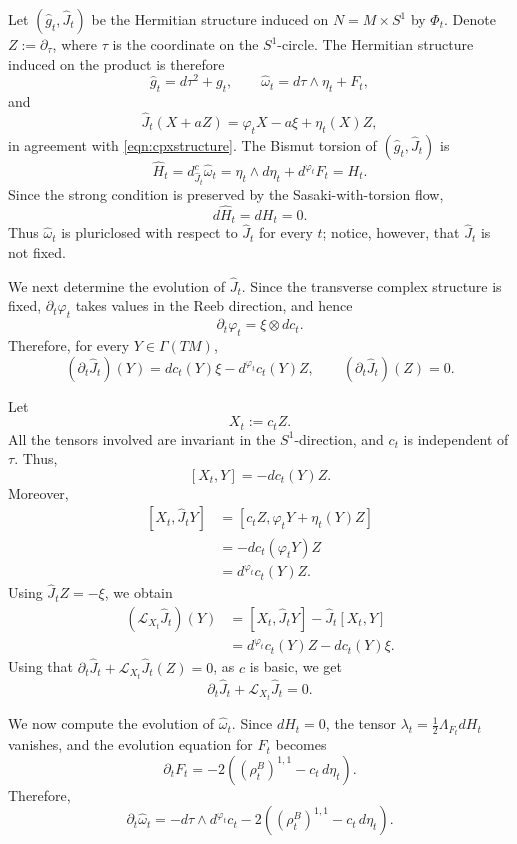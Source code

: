 \documentclass{article}
\makeatletter
\renewenvironment{proof}[1][\proofname]{%
  \par\pushQED{\qed}%
  \normalfont\topsep6\p@\@plus6\p@\relax
  \trivlist
  \item[\hskip\labelsep
        \textbf{\textup{#1}}\@addpunct{.}]\ignorespaces
}{%
  \popQED\endtrivlist\@endpefalse
}
\theoremstyle{definition}
\numberwithin{equation}{section}
\makeatother
\begin{document}
\begin{proof}
Let $(\widehat g_t,\widehat J_t)$ be the Hermitian structure induced on $N=M \times S^1$ by $\Phi_t$. Denote $Z:=\partial_\tau$, where $\tau$ is the coordinate on the $S^1$-circle. The Hermitian structure induced on the product is therefore 
\[
\widehat g_t=d\tau^2+g_t,
\qquad
\widehat\omega_t=d\tau\wedge\eta_t+F_t,
\]
and
\[
\widehat J_t(X+aZ)
=
\varphi_tX-a\xi+\eta_t(X)Z,
\]
in agreement with \eqref{eqn:cpxstructure}.
The Bismut torsion of $(\widehat g_t,\widehat J_t)$ is \[ \widehat H_t = d^c_{\widehat J_t}\widehat\omega_t = \eta_t\wedge d\eta_t+d^{\varphi_t}F_t = H_t. \] 
Since the strong condition is preserved by the Sasaki-with-torsion flow, \[ d\widehat H_t=dH_t=0. \] Thus $\widehat\omega_t$ is pluriclosed with respect to $\widehat J_t$ for every $t$; notice, however, that
$\widehat J_t$ is not fixed.

We next determine the evolution of $\widehat J_t$. Since the
transverse complex structure is fixed, $\partial_t\varphi_t$ takes
values in the Reeb direction, and hence
\[
\partial_t\varphi_t=\xi\otimes dc_t.
\]
Therefore, for every $Y\in \Gamma(TM)$,
\[
(\partial_t\widehat J_t)(Y)
=
dc_t(Y)\xi-d^{\varphi_t}c_t(Y)Z,
\qquad
(\partial_t\widehat J_t)(Z)=0.
\]

Let
\[
X_t:=c_tZ.
\]
All the tensors involved are invariant in the $S^1$-direction, and
$c_t$ is independent of $\tau$. Thus,
\[
[X_t,Y]=-dc_t(Y)Z.
\]
Moreover,
\[
\begin{aligned}
[X_t,\widehat J_tY]
&=
[c_tZ,\varphi_tY+\eta_t(Y)Z]\\
&=
-dc_t(\varphi_tY)Z\\
&=
d^{\varphi_t}c_t(Y)Z.
\end{aligned}
\]
Using $\widehat J_tZ=-\xi$, we obtain
\[
\begin{aligned}
(\mathcal L_{X_t}\widehat J_t)(Y)
&=
[X_t,\widehat J_tY]
-
\widehat J_t[X_t,Y]\\
&=
d^{\varphi_t}c_t(Y)Z-dc_t(Y)\xi.
\end{aligned}
\]
Using that $\partial_t\widehat J_t
+
\mathcal L_{X_t}\widehat J_t (Z)=0$, as $c$ is basic, we get
\[
\partial_t\widehat J_t
+
\mathcal L_{X_t}\widehat J_t
=
0.
\]

We now compute the evolution of $\widehat\omega_t$. Since $dH_t=0$,
the tensor $\lambda_t=\frac12\Lambda_{F_t}dH_t$ vanishes, and the
evolution equation for $F_t$ becomes
\[
\partial_tF_t
=
-2\left((\rho_t^B)^{1,1}-c_t\,d\eta_t\right).
\]
Therefore,
\begin{equation}
\label{eqn:product-omega-evolution}
\partial_t\widehat\omega_t
=
-d\tau\wedge d^{\varphi_t}c_t
-
2\left((\rho_t^B)^{1,1}-c_t\,d\eta_t\right).
\end{equation}


\end{proof}
\end{document}
